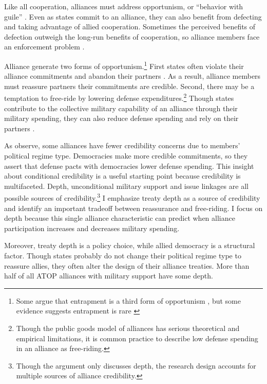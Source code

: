 \documentclass[12pt]{article}
\begin{document}
Like all cooperation, alliances must address opportunism, or ``behavior with guile'' \citep{Williamson1985}. 
Even as states commit to an alliance, they can also benefit from defecting and taking advantage of allied cooperation. 
Sometimes the perceived benefits of defection outweigh the long-run benefits of cooperation, so alliance members face an enforcement problem \citep{Fearon1998a, Koremenosetal2001}.


Alliance generate two forms of opportunism.\footnote{Some argue that entrapment is a third form of opportunism \citep{Snyder1984}, but some evidence suggests entrapment is rare \citep{Kim2011, Beckley2015}}
First states often violate their alliance commitments and abandon their partners \citep{BerkemeierFuhrmann2018}.
As a result, alliance members must reassure partners their commitments are credible. 
Second, there may be a temptation to free-ride by lowering defense expenditures.\footnote{Though the public goods model of alliances has serious theoretical and empirical limitations, it is common practice to describe low defense spending in an alliance as free-riding.}
Though states contribute to the collective military capability of an alliance through their military spending, they can also reduce defense spending and rely on their partners \citep{OlsonZeckhauser1966, Morrow1993, Conybeare1994, SandlerHartley2001}.


As \citet{DigiuseppePoast2016} observe, some alliances have fewer credibility concerns due to members' political regime type.
Democracies make more credible commitments, so they assert that defense pacts with democracies lower defense spending.
This insight about conditional credibility is a useful starting point because credibility is multifaceted. 
Depth, unconditional military support \citep{Benson2012, Chibaetal2015} and issue linkages \citep{LongLeeds2006, Poast2012, Poast2013} are all possible sources of credibility.\footnote{Though the argument only discusses depth, the research design accounts for multiple sources of alliance credibility.} 
I emphasize treaty depth as a source of credibility and identify an important tradeoff between reassurance and free-riding.  
I focus on depth because this single alliance characteristic can predict when alliance participation increases and decreases military spending. 


Moreover, treaty depth is a policy choice, while allied democracy is a structural factor. 
Though states probably do not change their political regime type to reassure allies, they often alter the design of their alliance treaties. 
More than half of all ATOP alliances with military support have some depth. 
\end{document}
